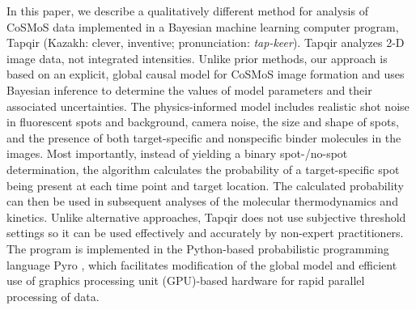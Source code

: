 

In this paper, we describe a qualitatively different method for analysis of CoSMoS data implemented in a Bayesian machine learning computer program, Tapqir (Kazakh: clever, inventive; pronunciation: \emph{tap-keer}). Tapqir analyzes 2-D image data, not integrated intensities.  Unlike prior methods, our approach is based on an explicit, global causal model for CoSMoS image formation and uses Bayesian inference to determine the values of model parameters and their associated uncertainties. The physics-informed model includes realistic shot noise in fluorescent spots and background, camera noise, the size and shape of spots, and the presence of both target-specific and nonspecific binder molecules in the images. Most importantly, instead of yielding a binary spot-/no-spot determination, the algorithm calculates the probability of a target-specific spot being present at each time point and target location. The calculated probability can then be used in subsequent analyses of the molecular thermodynamics and kinetics. Unlike alternative approaches, Tapqir does not use subjective threshold settings so it can be used effectively and accurately by non-expert practitioners. The program is implemented in the Python-based probabilistic programming language Pyro \citep{Bingham2019-qy}, which facilitates modification of the global model and efficient use of graphics processing unit (GPU)-based hardware for rapid parallel processing of data. 